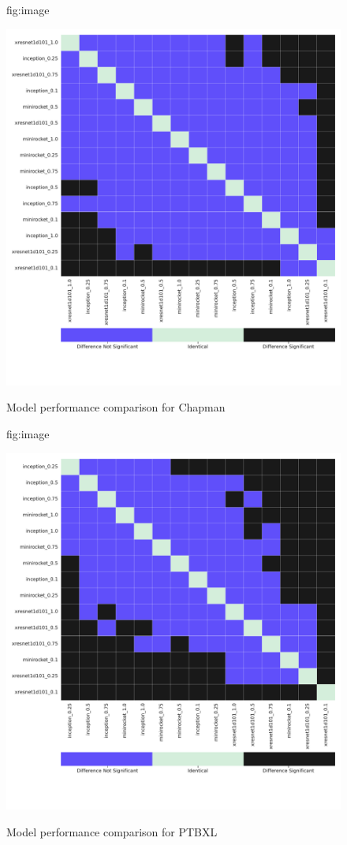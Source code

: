 \documentclass[pmlr,twocolumn]{jmlr}%
\begin{document}
\begin{figure}[htbp]
\floatconts
  {fig:image}
  {\caption{Model performance comparison for Chapman}}
  {\includegraphics[width=1\linewidth]{images/model_comparisons_ChapmanShaoxing.pdf}}
 
\end{figure}

\begin{figure}[htbp]
\floatconts
  {fig:image}
  {\caption{Model performance comparison for PTBXL}}
  {\includegraphics[width=1\linewidth]{images/model_comparisons_PTBXL.pdf}}
 
\end{figure}
\end{document}
